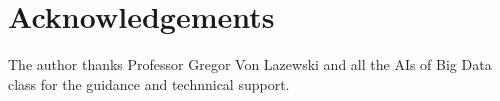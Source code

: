 \documentclass[9pt,twocolumn,twoside]{../../styles/osajnl}
\begin{document}
\section{Acknowledgements}

The author thanks Professor Gregor Von Lazewski and all the AIs of Big
Data class for the guidance and technnical support.




 
\end{document}

